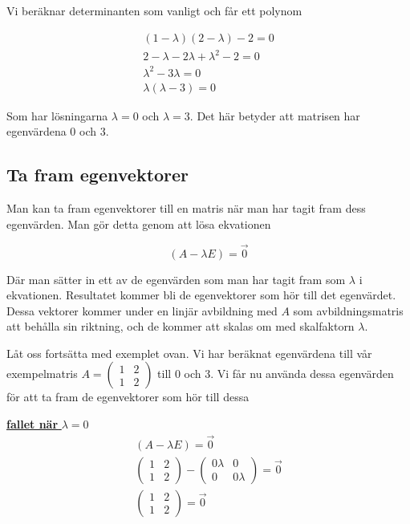 \documentclass[../main.tex]{subfiles}
\begin{document}
Vi beräknar determinanten som vanligt och får ett polynom

\begin{align*}
(1-\lambda)(2-\lambda) - 2 = 0\\
2 - \lambda - 2\lambda + \lambda^2 - 2 = 0\\
\lambda^2 - 3\lambda = 0\\
\lambda (\lambda - 3) = 0
\end{align*}

Som har lösningarna $\lambda = 0$ och $\lambda = 3$. Det här betyder att matrisen har egenvärdena 0 och 3.

\subsection{Ta fram egenvektorer}
Man kan ta fram egenvektorer till en matris när man har tagit fram dess egenvärden. Man gör detta genom att lösa ekvationen

$$
(A - \lambda E) = \Vec{0}
$$

Där man sätter in ett av de egenvärden som man har tagit fram som $\lambda$ i ekvationen. Resultatet kommer bli de egenvektorer som hör till det egenvärdet. Dessa vektorer kommer under en linjär avbildning med $A$ som avbildningsmatris att behålla sin riktning, och de kommer att skalas om med skalfaktorn $\lambda$.

Låt oss fortsätta med exemplet ovan. Vi har beräknat egenvärdena till vår exempelmatris $A = \begin{pmatrix}
    1 & 2\\
    1 & 2
\end{pmatrix}$ till 0 och 3. Vi får nu använda dessa egenvärden för att ta fram de egenvektorer som hör till dessa

\underline{\textbf{fallet när }$\lambda = 0$}\\

\begin{align*}
    (A - \lambda E) = \vec{0}\\
    \begin{pmatrix}
        1 & 2\\
        1 & 2
    \end{pmatrix} - 
    \begin{pmatrix}
        0\lambda & 0\\
        0 & 0\lambda
    \end{pmatrix} = \vec{0}\\
    \begin{pmatrix}
        1 & 2\\
        1 & 2
    \end{pmatrix} = \Vec{0}
\end{align*}
\end{document}
